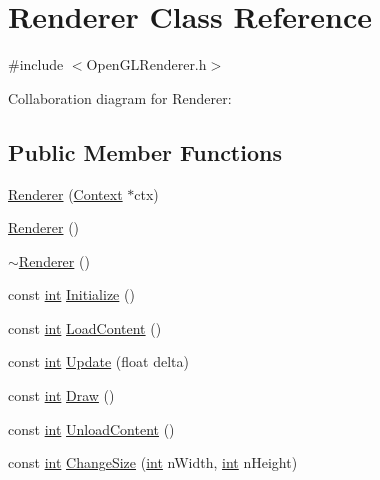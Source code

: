 \hypertarget{class_renderer}{\section{Renderer Class Reference}
\label{class_renderer}
}


{\ttfamily \#include $<$Open\-G\-L\-Renderer.\-h$>$}



Collaboration diagram for Renderer\-:
\subsection*{Public Member Functions}
\begin{DoxyCompactItemize}
\item 
\hyperlink{class_renderer_a93739e2106db9a71a989624e2aba351b}{Renderer} (\hyperlink{class_context}{Context} $\ast$ctx)
\item 
\hyperlink{class_renderer_a7ebf46f54dab9905f79b80f7fddb76a6}{Renderer} ()
\item 
\hyperlink{class_renderer_afeee408862d5bd6255a6882d47e6d5cd}{$\sim$\-Renderer} ()
\item 
const \hyperlink{_s_d_l__thread_8h_a6a64f9be4433e4de6e2f2f548cf3c08e}{int} \hyperlink{class_renderer_aeecf8faabad34ae777fe78072b1cf3dc}{Initialize} ()
\item 
const \hyperlink{_s_d_l__thread_8h_a6a64f9be4433e4de6e2f2f548cf3c08e}{int} \hyperlink{class_renderer_aaecd57c557b19b663dde3f9b68c7225b}{Load\-Content} ()
\item 
const \hyperlink{_s_d_l__thread_8h_a6a64f9be4433e4de6e2f2f548cf3c08e}{int} \hyperlink{class_renderer_a64742dbde9e2395eda3331f30285e952}{Update} (float delta)
\item 
const \hyperlink{_s_d_l__thread_8h_a6a64f9be4433e4de6e2f2f548cf3c08e}{int} \hyperlink{class_renderer_adeff95953a3591a3fd64102d4c96c248}{Draw} ()
\item 
const \hyperlink{_s_d_l__thread_8h_a6a64f9be4433e4de6e2f2f548cf3c08e}{int} \hyperlink{class_renderer_a565a7473e51799603e441cec72247254}{Unload\-Content} ()
\item 
const \hyperlink{_s_d_l__thread_8h_a6a64f9be4433e4de6e2f2f548cf3c08e}{int} \hyperlink{class_renderer_a7acf9ae659b0dcb9b552056789bd14b0}{Change\-Size} (\hyperlink{_s_d_l__thread_8h_a6a64f9be4433e4de6e2f2f548cf3c08e}{int} n\-Width, \hyperlink{_s_d_l__thread_8h_a6a64f9be4433e4de6e2f2f548cf3c08e}{int} n\-Height)
\end{DoxyCompactItemize}
